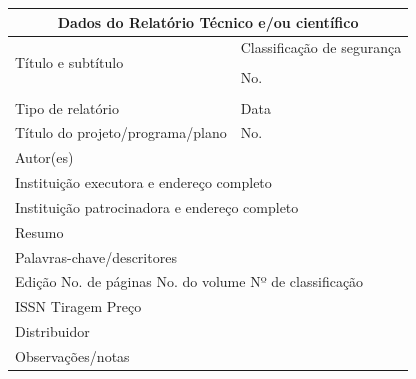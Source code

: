\documentclass[
  12pt,				%
  openright,			%
  twoside,			%
  a4paper,			%
  english,			%
  french,				%
  spanish,			%
  brazil,				%
  ]{abntex2}
\begin{document}
\begin{tabular}{|p{8cm}|p{5cm}|}
  \hline
  \multicolumn{2}{|c|}{\textbf{\large Dados do Relatório Técnico e/ou científico}}               \\
  \hline
  \multirow{3}{8cm}[24pt]{Título e subtítulo} & Classificação de segurança                       \\
                                              &                                                  \\
  \cline{2-2}
                                              & No.                                              \\
                                              &                                                  \\

  \hline
  Tipo de relatório                           & Data                                             \\
  \hline
  Título do projeto/programa/plano            & No.                                              \\
  \hline
  \multicolumn{2}{|l|}{Autor(es)}                                                                \\
  \hline
  \multicolumn{2}{|l|}{Instituição executora e endereço completo}                                \\
  \hline
  \multicolumn{2}{|l|}{Instituição patrocinadora e endereço completo}                            \\
  \hline
  \multicolumn{2}{|l|}{Resumo}                                                                   \\[3cm]
  \hline
  \multicolumn{2}{|l|}{Palavras-chave/descritores}                                               \\
  \hline
  \multicolumn{2}{|l|}{
    Edição \hfill No. de páginas \hfill No. do volume \hfill Nº de classificação \phantom{XXXX}} \\
  \hline
  \multicolumn{2}{|l|}{
    ISSN \hfill \hfill Tiragem \hfill Preço \phantom{XXXXXXXX}}                                  \\
  \hline
  \multicolumn{2}{|l|}{Distribuidor}                                                             \\
  \hline
  \multicolumn{2}{|l|}{Observações/notas}                                                        \\[3cm]
  \hline
\end{tabular}
\end{document}
